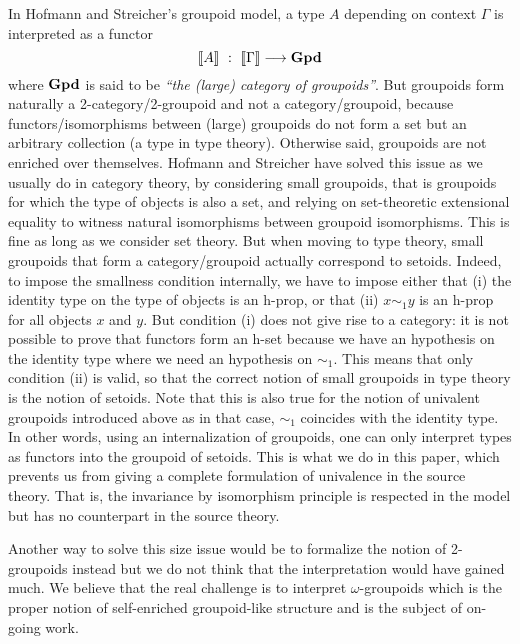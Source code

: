 In Hofmann and Streicher's groupoid model, a type $A$ depending on
context $\Gamma$ is interpreted as a functor 
$$
\sem{A} \ : \ \sem{\Gamma} \longrightarrow \GPD
$$
%
where $\mathbf{Gpd}$ is said to be \emph{``the (large) category of groupoids''}. 
%
But groupoids form naturally a 2-category/2-groupoid and not a
category/groupoid, because functors/isomorphisms between (large)
groupoids do not form a set but an arbitrary collection (a type in type
theory). Otherwise said, groupoids are not enriched over themselves.
%
Hofmann and Streicher have solved this issue as we usually do in
category theory, by considering small groupoids, that is groupoids for
which the type of objects is also a set, and relying on set-theoretic
extensional equality to witness natural isomorphisms between groupoid 
isomorphisms. This is fine as long as we consider set theory.
%
But when moving to type theory, small groupoids that form a
category/groupoid actually correspond to setoids. Indeed, to impose the
smallness condition internally, we have to impose either that (i)
the identity type on the type of objects is an h-prop, or that (ii) $x
\sim_1 y$ is an h-prop for all objects $x$ and $y$. But
condition (i) does not give rise to a category: it is not possible to prove that
functors form an h-set because we have an hypothesis on the identity type
where we need an hypothesis on $\sim_1$. 
%
This means that only condition (ii) is valid, so that the
correct notion of small groupoids in type theory is the notion of
setoids.
%
Note that this is also true for the notion of univalent groupoids
introduced above as in that case, $\sim_1$ coincides with the identity type.
%
In other words, using an internalization of groupoids, one can only
interpret types as functors into the groupoid of setoids. This is what we do
in this paper, which prevents us from giving a complete formulation of
univalence in the source theory. That is, the invariance by
isomorphism principle is respected in the model but has no counterpart
in the source theory. 

Another way to solve this size issue would be to formalize the notion of
2-groupoids instead but we do not think that the interpretation would
have gained much. We believe that the real challenge is to interpret
$\omega$-groupoids which is the proper notion of self-enriched 
groupoid-like structure and is the subject of on-going work.



